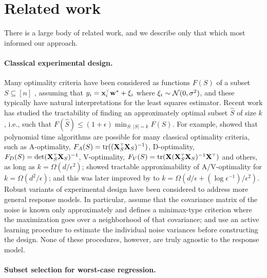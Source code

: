 \documentclass[12pt]{sty/colt2019/colt2018-arxiv}
\begin{document}
\section{Related work}
\label{s:related-work}

There is a large body of related work, and we describe only that which
most informed our approach. 


\paragraph{Classical experimental design.}

Many optimality criteria have been considered as functions $F(S)$ of a
subset $S\subseteq [n]$ \citep{optimal-design-pukelsheim}, assuming
that $y_i=\x_i^\top\w^*+\xi_i$ where $\xi_i\sim\mathcal{N}(0,\sigma^2)$, and
these typically have natural interpretations for the least squares
estimator.  
Recent work has studied the tractability of finding an approximately
optimal subset $\widehat{S}$ of size $k$, i.e., such that
$F(\widehat{S}) \leq (1+\epsilon) \min_{S:\,|S|=k}F(S)$.  
For example, 
\cite{near-optimal-design} showed that polynomial time algorithms are
possible for many classical optimality criteria, such as A-optimality,
$F_A(S)=\tr((\X_S^\top\X_S)^{-1})$, D-optimality,
$F_D(S)=\det(\X_S^\top\X_S)^{-1}$, V-optimality,
$F_V(S)=\tr(\X(\X_S^\top\X_S)^{-1}\X^\top)$ and others, as long as
$k=\Omega(d/\epsilon^2)$;  
\cite{tractable-experimental-design} showed tractable approximability of A/V-optimality for $k=\Omega(d^2/\epsilon)$; and 
this was later improved by \cite{proportional-volume-sampling} to $k=\Omega(d/\epsilon + (\log\epsilon^{-1})/\epsilon^2)$. 
%
Robust variants of experimental design have been considered to address more general response models. 
In particular, 
\cite{robust-design} assume that the covariance matrix of the noise is
known only approximately and defines a minimax-type criterion where
the maximization goes over a neighborhood of that covariance; and  
\cite{v-optimal} use an active learning procedure to estimate the 
individual noise variances before constructing the design.  
None of these procedures, however, are truly agnostic to the response
model. 


\paragraph{Subset selection for worst-case regression.} 
\end{document}
